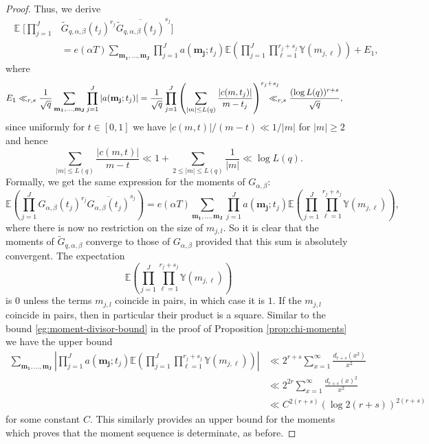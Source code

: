 \documentclass[12pt, a4paper]{amsart}
\theoremstyle{remark}
\newcommand{\abs}[1]{\left|#1\right|}
\newcommand{\bY}{\mathbb{Y}}
\newcommand{\bE}{\mathbb{E}}
\DeclareMathOperator{\E}{\mathbb{E}}
\begin{document}
\begin{proof}
Thus, we derive
\begin{align*}\
    \E \Bigg[ \prod_{j=1}^J & \tilde G_{q,\alpha,\beta}(t_j)^{r_j} \overline{\tilde G_{q,\alpha,\beta}(t_j)}^{s_j} \Bigg] \\
        & = e(\alpha T)
    \sum_{\mathbf{m_1}, \dots, \mathbf{m_J}}
        \prod_{j=1}^J a(\mathbf{m_j}; t_j)
        \bE\left(\prod_{j=1}^J\prod_{\ell=1}^{r_j+s_j} \bY(m_{j, \ell})\right)  + E_1,
\end{align*}
where 
\begin{align*}
 E_1 &
    \ll_{r, s} \frac{1}{\sqrt{q}} \sum_{\mathbf{m_1}, \dots, \mathbf{m_J}}
        \prod_{j=1}^J |a(\mathbf{m_j}; t_j)|
        = \frac{1}{\sqrt{q}}\prod_{j=1}^J
            \left(\sum_{|m|\leq L(q)} \frac{|c(m ,t_j)|}{m - t_j}\right)^{r_j+s_j}
            \hspace{-1.5em}\ll_{r, s} \frac{(\log L(q))^{r+s}}{\sqrt{q}},
 \end{align*}
since uniformly for $t\in [0,1]$ we have $|c(m ,t)|/(m - t)\ll 1/|m|$ for $|m|\geq 2$ and hence
\[
    \sum_{|m|\leq L(q)} \frac{|c(m ,t)|}{m - t} \ll
        1 + \sum_{2\leq |m|\leq L(q)} \frac{1}{|m|} \ll \log L(q).
\]
Formally, we get the same expression for the moments of $G_{\alpha,\beta}:$
\[
\bE\left(\prod_{j=1}^J
{G}_{\alpha,\beta}(t_j)^{r_j} \overline{{G}_{\alpha,\beta}(t_j)}^{s_j}\right)
=
e(\alpha T)
    \sum_{\mathbf{m_1}, \dots, \mathbf{m_J}}
        \prod_{j=1}^J a(\mathbf{m_j}; t_j)
        \bE\left(\prod_{j=1}^J\prod_{\ell=1}^{r_j+s_j} \bY(m_{j, \ell})\right),
\]
where there is now no restriction on the size of $m_{j,l}$. So it is clear
that the moments of $\tilde G_{q,\alpha,\beta}$ converge to those of
$G_{\alpha,\beta}$ provided that this sum is absolutely convergent.
The expectation
\[
    \bE\left(\prod_{j=1}^J\prod_{\ell=1}^{r_j+s_j} \bY(m_{j, \ell})\right)
\]
is $0$ unless the terms $m_{j,l}$ coincide in pairs, in which case it is $1$.
If the $m_{j,l}$ coincide in pairs, then in particular their product is a
square. Similar to the bound \eqref{eg:moment-divisor-bound} in the proof of
Proposition \ref{prop:chi-moments} we have the upper bound
\begin{align*}
    \sum_{\mathbf{m_1}, \dots, \mathbf{m_J}}
        \abs{\prod_{j=1}^J a(\mathbf{m_j}; t_j)
        \bE\left(\prod_{j=1}^J\prod_{\ell=1}^{r_j+s_j} \bY(m_{j, \ell})\right)}
    & 
    \ll
    2^{r+s} \sum_{x=1}^\infty \frac{d_{r+s}(x^2)}{x^2} \\
    &
    \ll 2^{2r} \sum_{x=1}^\infty \frac{d_{r+s}(x)^2}{x^2} \\
    &
    \ll C^{2(r+s)}(\log 2(r+s))^{2(r+s)}
\end{align*}
for some constant $C$. This similarly provides an upper bound for the moments
which proves that the moment sequence is determinate, as before.
\end{proof}
\end{document}
